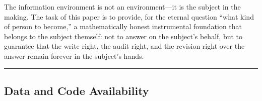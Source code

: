 \documentclass[
  11pt]{article}
\begin{document}
The information environment is not an environment---it is the subject in
the making. The task of this paper is to provide, for the eternal
question ``what kind of person to become,'' a mathematically honest
instrumental foundation that belongs to the subject themself: not to
answer on the subject's behalf, but to guarantee that the write right,
the audit right, and the revision right over the answer remain forever
in the subject's hands.

\begin{center}\rule{0.5\linewidth}{0.5pt}\end{center}

\subsection{Data and Code
Availability}\label{data-and-code-availability}
\end{document}
